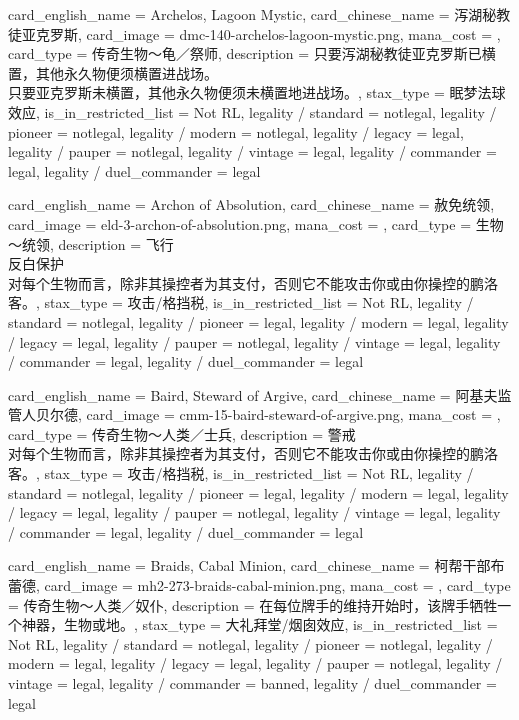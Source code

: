 \documentclass[lang = cn, color = black, 10pt]{AllThatStax}
\begin{document}
\card
{
	card_english_name = {Archelos, Lagoon Mystic},
	card_chinese_name = {泻湖秘教徒亚克罗斯},
	card_image = dmc-140-archelos-lagoon-mystic.png,
	mana_cost = ,
	card_type = 传奇生物～龟／祭师,
	description = {只要泻湖秘教徒亚克罗斯已横置，其他永久物便须横置进战场。\\
只要亚克罗斯未横置，其他永久物便须未横置地进战场。},
	stax_type = 眠梦法球效应,
	is_in_restricted_list = Not RL,
	legality / standard = notlegal,
	legality / pioneer = notlegal,
	legality / modern = notlegal,
	legality / legacy = legal,
	legality / pauper = notlegal,
	legality / vintage = legal,
	legality / commander = legal,
	legality / duel_commander = legal
}

\card
{
	card_english_name = {Archon of Absolution},
	card_chinese_name = {赦免统领},
	card_image = eld-3-archon-of-absolution.png,
	mana_cost = ,
	card_type = 生物～统领,
	description = {飞行\\
反白保护\\
对每个生物而言，除非其操控者为其支付，否则它不能攻击你或由你操控的鹏洛客。},
	stax_type = 攻击/格挡税,
	is_in_restricted_list = Not RL,
	legality / standard = notlegal,
	legality / pioneer = legal,
	legality / modern = legal,
	legality / legacy = legal,
	legality / pauper = notlegal,
	legality / vintage = legal,
	legality / commander = legal,
	legality / duel_commander = legal
}

\card
{
	card_english_name = {Baird, Steward of Argive},
	card_chinese_name = {阿基夫监管人贝尔德},
	card_image = cmm-15-baird-steward-of-argive.png,
	mana_cost = ,
	card_type = 传奇生物～人类／士兵,
	description = {警戒\\
对每个生物而言，除非其操控者为其支付，否则它不能攻击你或由你操控的鹏洛客。},
	stax_type = 攻击/格挡税,
	is_in_restricted_list = Not RL,
	legality / standard = notlegal,
	legality / pioneer = legal,
	legality / modern = legal,
	legality / legacy = legal,
	legality / pauper = notlegal,
	legality / vintage = legal,
	legality / commander = legal,
	legality / duel_commander = legal
}

\card
{
	card_english_name = {Braids, Cabal Minion},
	card_chinese_name = {柯帮干部布蕾德},
	card_image = mh2-273-braids-cabal-minion.png,
	mana_cost = ,
	card_type = 传奇生物～人类／奴仆,
	description = {在每位牌手的维持开始时，该牌手牺牲一个神器，生物或地。},
	stax_type = 大礼拜堂/烟囱效应,
	is_in_restricted_list = Not RL,
	legality / standard = notlegal,
	legality / pioneer = notlegal,
	legality / modern = legal,
	legality / legacy = legal,
	legality / pauper = notlegal,
	legality / vintage = legal,
	legality / commander = banned,
	legality / duel_commander = legal
}
\end{document}
